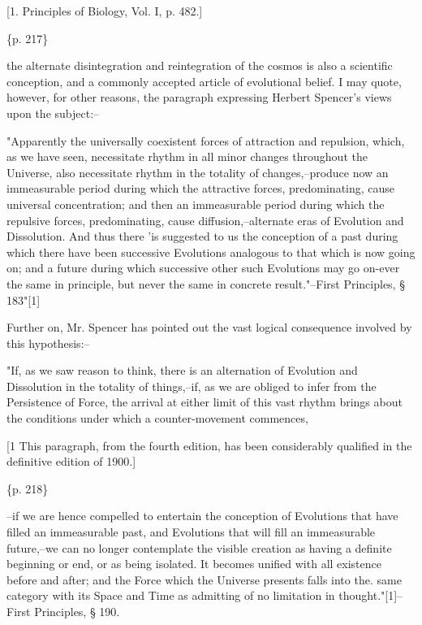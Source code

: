 [1. Principles of Biology, Vol. I, p. 482.]

\{p. 217\}

the alternate disintegration and reintegration of the cosmos is also a scientific conception, and a commonly accepted article of evolutional belief. I may quote, however, for other reasons, the paragraph expressing Herbert Spencer's views upon the subject:--

"Apparently the universally coexistent forces of attraction and repulsion, which, as we have seen, necessitate rhythm in all minor changes throughout the Universe, also necessitate rhythm in the totality of changes,--produce now an immeasurable period during which the attractive forces, predominating, cause universal concentration; and then an immeasurable period during which the repulsive forces, predominating, cause diffusion,--alternate eras of Evolution and Dissolution. And thus there 'is suggested to us the conception of a past during which there have been successive Evolutions analogous to that which is now going on; and a future during which successive other such Evolutions may go on-ever the same in principle, but never the same in concrete result."--First Principles, § 183"[1]

Further on, Mr. Spencer has pointed out the vast logical consequence involved by this hypothesis:--

"If, as we saw reason to think, there is an alternation of Evolution and Dissolution in the totality of things,--if, as we are obliged to infer from the Persistence of Force, the arrival at either limit of this vast rhythm brings about the conditions under which a counter-movement commences,

[1 This paragraph, from the fourth edition, has been considerably qualified in the definitive edition of 1900.]

\{p. 218\}

--if we are hence compelled to entertain the conception of Evolutions that have filled an immeasurable past, and Evolutions that will fill an immeasurable future,--we can no longer contemplate the visible creation as having a definite beginning or end, or as being isolated. It becomes unified with all existence before and after; and the Force which the Universe presents falls into the. same category with its Space and Time as admitting of no limitation in thought."[1]--First Principles, § 190.

